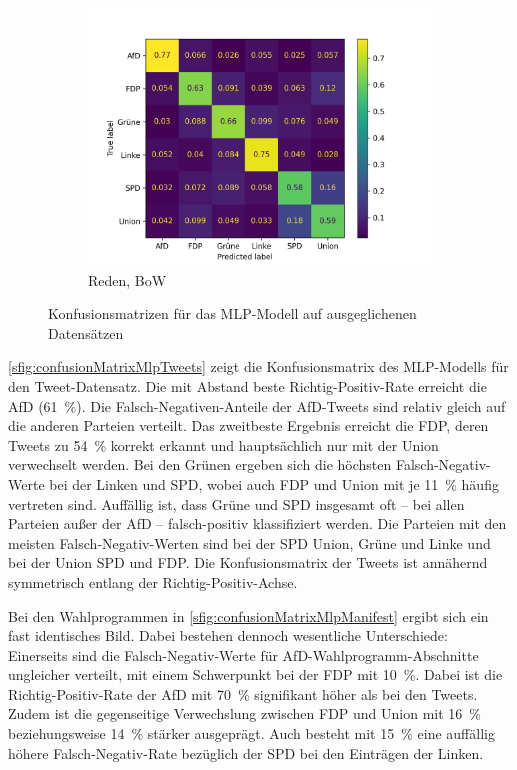 \begin{figure}[H]
\begin{subfigure}{0.49\textwidth}
    \includegraphics[width=\textwidth]{data/images/modeling/mlp/under/speeches_confusion_matrix.png}
    \caption{Reden, \ac{BoW}}
    \label{sfig:confusionMatrixMlpSpeeches}
  \end{subfigure}
  \caption{Konfusionsmatrizen für das \acs{MLP}-Modell auf ausgeglichenen Datensätzen} \label{fig:confusionMatrixMlp}
\end{figure}

\autoref{sfig:confusionMatrixMlpTweets} zeigt die Konfusionsmatrix des \ac{MLP}-Modells für den Tweet-Datensatz. Die mit Abstand beste Richtig-Positiv-Rate erreicht die \ac{AfD} (\SI{61}{\percent}). Die Falsch-Negativen-Anteile der \ac{AfD}-Tweets sind relativ gleich auf die anderen Parteien verteilt. Das zweitbeste Ergebnis erreicht die \ac{FDP}, deren Tweets zu \SI{54}{\percent} korrekt erkannt und hauptsächlich nur mit der Union verwechselt werden. Bei den Grünen ergeben sich die höchsten Falsch-Negativ-Werte bei der Linken und \ac{SPD}, wobei auch \ac{FDP} und Union mit je \SI{11}{\percent} häufig vertreten sind. Auffällig ist, dass Grüne und \ac{SPD} insgesamt oft -- bei allen Parteien außer der \ac{AfD} -- falsch-positiv klassifiziert werden. Die Parteien mit den meisten Falsch-Negativ-Werten sind bei der \ac{SPD} Union, Grüne und Linke und bei der Union \ac{SPD} und \ac{FDP}. Die Konfusionsmatrix der Tweets ist annähernd symmetrisch entlang der Richtig-Positiv-Achse.

Bei den Wahlprogrammen in \autoref{sfig:confusionMatrixMlpManifest} ergibt sich ein fast identisches Bild. Dabei bestehen dennoch wesentliche Unterschiede: Einerseits sind die Falsch-Negativ-Werte für \ac{AfD}-Wahlprogramm-Abschnitte ungleicher verteilt, mit einem Schwerpunkt bei der \ac{FDP} mit \SI{10}{\percent}. Dabei ist die Richtig-Positiv-Rate der \ac{AfD} mit \SI{70}{\percent} signifikant höher als bei den Tweets. Zudem ist die gegenseitige Verwechslung zwischen \ac{FDP} und Union mit \SI{16}{\percent} beziehungsweise \SI{14}{\percent} stärker ausgeprägt. Auch besteht mit \SI{15}{\percent} eine auffällig höhere Falsch-Negativ-Rate bezüglich der \ac{SPD} bei den Einträgen der Linken.


